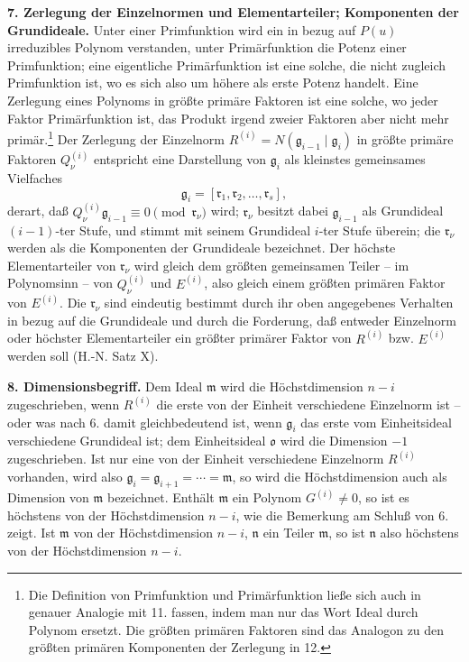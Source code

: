 \documentclass[11pt]{article}
\providecommand{\frakm}{\mathfrak m}
\providecommand{\frakn}{\mathfrak n}
\providecommand{\frakr}{\mathfrak r}
\providecommand{\frakg}{\mathfrak g}
\providecommand{\frako}{\mathfrak o}
\begin{document}
\textbf{7. Zerlegung der Einzelnormen und Elementarteiler; Komponenten der Grundideale.} Unter einer Primfunktion wird ein in bezug auf $P(u)$ irreduzibles Polynom verstanden, unter Primärfunktion die Potenz einer Primfunktion; eine eigentliche Primärfunktion ist eine solche, die nicht zugleich Primfunktion ist, wo es sich also um höhere als erste Potenz handelt. Eine Zerlegung eines Polynoms in größte primäre Faktoren ist eine solche, wo jeder Faktor Primärfunktion ist, das Produkt irgend zweier Faktoren aber nicht mehr primär.\footnote{Die Definition von Primfunktion und Primärfunktion ließe sich auch in genauer Analogie mit 11. fassen, indem man nur das Wort Ideal durch Polynom ersetzt. Die größten primären Faktoren sind das Analogon zu den größten primären Komponenten der Zerlegung in 12.} Der Zerlegung der Einzelnorm $R^{(i)}=N(\frakg_{i-1}\mid\frakg_i)$ in größte primäre Faktoren $Q_\nu^{(i)}$ entspricht eine Darstellung von $\frakg_i$ als kleinstes gemeinsames Vielfaches
\[
 \frakg_i=[\frakr_1,\frakr_2,\ldots,\frakr_s],
\]
derart, daß $Q_\nu^{(i)}\frakg_{i-1}\equiv0\pmod{\frakr_\nu}$ wird; $\frakr_\nu$ besitzt dabei $\frakg_{i-1}$ als Grundideal $(i-1)$-ter Stufe, und stimmt mit seinem Grundideal $i$-ter Stufe überein; die $\frakr_\nu$ werden als die Komponenten der Grundideale bezeichnet. Der höchste Elementarteiler von $\frakr_\nu$ wird gleich dem größten gemeinsamen Teiler -- im Polynomsinn -- von $Q_\nu^{(i)}$ und $E^{(i)}$, also gleich einem größten primären Faktor von $E^{(i)}$. Die $\frakr_\nu$ sind eindeutig bestimmt durch ihr oben angegebenes Verhalten in bezug auf die Grundideale und durch die Forderung, daß entweder Einzelnorm oder höchster Elementarteiler ein größter primärer Faktor von $R^{(i)}$ bzw. $E^{(i)}$ werden soll (H.-N. Satz X).

\textbf{8. Dimensionsbegriff.} Dem Ideal $\frakm$ wird die Höchstdimension $n-i$ zugeschrieben, wenn $R^{(i)}$ die erste von der Einheit verschiedene Einzelnorm ist -- oder was nach 6. damit gleichbedeutend ist, wenn $\frakg_i$ das erste vom Einheitsideal verschiedene Grundideal ist; dem Einheitsideal $\frako$ wird die Dimension $-1$ zugeschrieben. Ist nur eine von der Einheit verschiedene Einzelnorm $R^{(i)}$ vorhanden, wird also $\frakg_i=\frakg_{i+1}=\cdots=\frakm$, so wird die Höchstdimension auch als Dimension von $\frakm$ bezeichnet. Enthält $\frakm$ ein Polynom $G^{(i)}\ne0$, so ist es höchstens von der Höchstdimension $n-i$, wie die Bemerkung am Schluß von 6. zeigt. Ist $\frakm$ von der Höchstdimension $n-i$, $\frakn$ ein Teiler $\frakm$, so ist $\frakn$ also höchstens von der Höchstdimension $n-i$.
\end{document}
